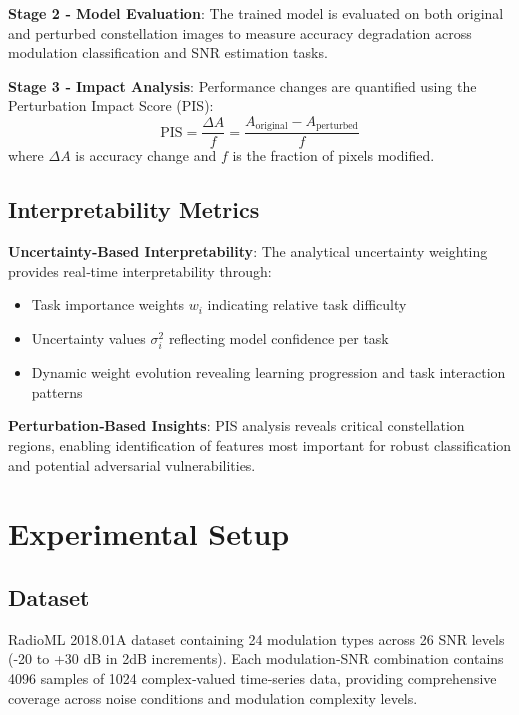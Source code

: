 \documentclass{ELSP}
\begin{document}
\textbf{Stage 2 ‑ Model Evaluation}: The trained model is evaluated on both original and perturbed constellation images to measure accuracy degradation across modulation classification and SNR estimation tasks.

\textbf{Stage 3 ‑ Impact Analysis}: Performance changes are quantified using the Perturbation Impact Score (PIS):
\begin{equation}
\text{PIS} = \frac{\Delta A}{f} = \frac{A_{\text{original}} - A_{\text{perturbed}}}{f}
\end{equation}
where $\Delta A$ is accuracy change and $f$ is the fraction of pixels modified.

\subsection{Interpretability Metrics}

\textbf{Uncertainty‑Based Interpretability}: The analytical uncertainty weighting provides real‑time interpretability through:
\begin{itemize}
\item Task importance weights $w_i$ indicating relative task difficulty
\item Uncertainty values $\sigma_i^2$ reflecting model confidence per task
\item Dynamic weight evolution revealing learning progression and task interaction patterns
\end{itemize}

\textbf{Perturbation‑Based Insights}: PIS analysis reveals critical constellation regions, enabling identification of features most important for robust classification and potential adversarial vulnerabilities.

\section{Experimental Setup}

\subsection{Dataset}
RadioML 2018.01A dataset containing 24 modulation types across 26 SNR levels (-20 to +30 dB in 2dB increments). Each modulation‑SNR combination contains 4096 samples of 1024 complex‑valued time‑series data, providing comprehensive coverage across noise conditions and modulation complexity levels.
\end{document}
